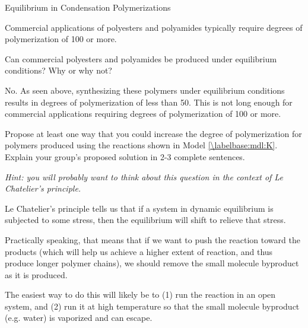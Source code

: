 \begin{activity}{Equilibrium in Condensation Polymerizations}
\begin{infobox}
	Commercial applications of polyesters and polyamides typically require degrees of polymerization of 100 or more.  

\end{infobox}

\begin{ctqs}
		
		\question Can commercial polyesters and polyamides be produced under equilibrium conditions?  Why or why not?
		
			\begin{solution}[1.5in]
			
				No. As seen above, synthesizing these polymers under equilibrium conditions results in degrees of polymerization of less than 50.  This is not long enough for commercial applications requiring degrees of polymerization of 100 or more.
			
			\end{solution}
			
		\question Propose at least one way that you could increase the degree of polymerization for polymers produced using the reactions shown in Model \ref{\labelbase:mdl:K}.  Explain your group's proposed solution in 2-3 complete sentences.
		
			\emph{Hint: you will probably want to think about this question in the context of Le Chatelier's principle.}
		
			\begin{solution}[2in]
			
				Le Chatelier's principle tells us that if a system in dynamic equilibrium is subjected to some stress, then the equilibrium will shift to relieve that stress.
				
				Practically speaking, that means that if we want to push the reaction toward the products (which will help us achieve a higher extent of reaction, and thus produce longer polymer chains), we should remove the small molecule byproduct as it is produced.
				
				The easiest way to do this will likely be to (1) run the reaction in an open system, and (2) run it at high temperature so that the small molecule byproduct (e.g. water) is vaporized and can escape.
			
			\end{solution}
		
\end{ctqs}

\clearpage
\begin{model}
\label{\labelbase:mdl:PET}


\end{model}
\end{activity}
